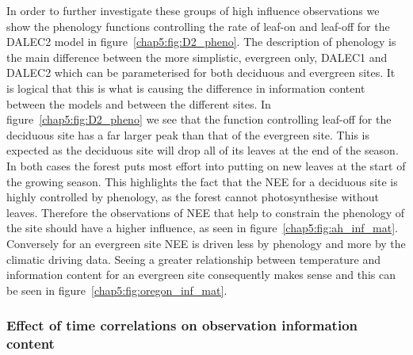 In order to further investigate these groups of high influence observations we show the phenology functions controlling the rate of leaf-on and leaf-off for the DALEC2 model in figure~\ref{chap5:fig:D2_pheno}. The description of phenology is the main difference between the more simplistic, evergreen only, DALEC1 and DALEC2 which can be parameterised for both deciduous and evergreen sites. It is logical that this is what is causing the difference in information content between the models and between the different sites. In figure~\ref{chap5:fig:D2_pheno} we see that the function controlling leaf-off for the deciduous site has a far larger peak than that of the evergreen site. This is expected as the deciduous site will drop all of its leaves at the end of the season. In both cases the forest puts most effort into putting on new leaves at the start of the growing season. This highlights the fact that the NEE for a deciduous site is highly controlled by phenology, as the forest cannot photosynthesise without leaves. Therefore the observations of NEE that help to constrain the phenology of the site should have a higher influence, as seen in figure~\ref{chap5:fig:ah_inf_mat}. Conversely for an evergreen site NEE is driven less by phenology and more by the climatic driving data. Seeing a greater relationship between temperature and information content  for an evergreen site consequently makes sense and this can be seen in figure~\ref{chap5:fig:oregon_inf_mat}.



\subsubsection{Effect of time correlations on observation information content}

